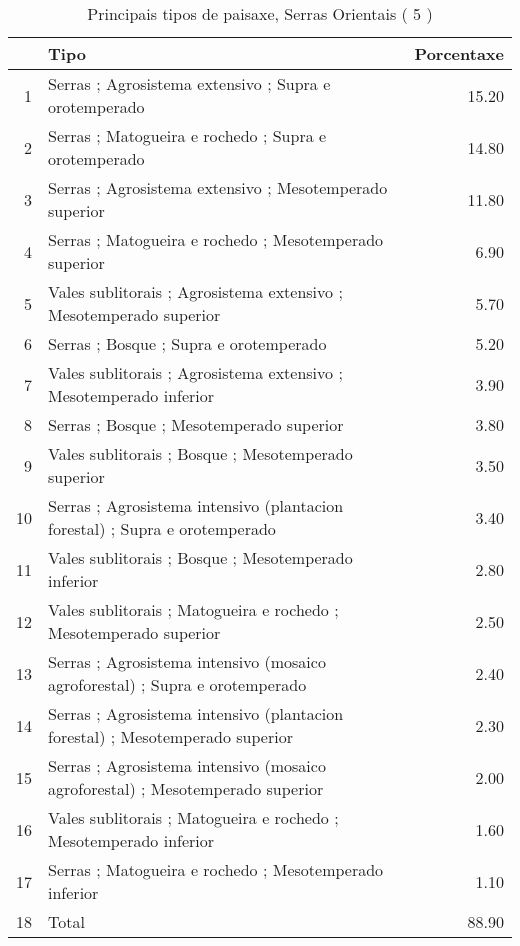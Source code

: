 \begin{table}[p]
\centering
\caption{Principais tipos de paisaxe,  Serras Orientais ( 5 )} 
\label{Tipos 5}
\begin{tabular}{rlr}
  \hline
 & Tipo & Porcentaxe \\ 
  \hline
1 & Serras ; Agrosistema extensivo ; Supra e orotemperado & 15.20 \\ 
  2 & Serras ; Matogueira e rochedo ; Supra e orotemperado & 14.80 \\ 
  3 & Serras ; Agrosistema extensivo ; Mesotemperado superior & 11.80 \\ 
  4 & Serras ; Matogueira e rochedo ; Mesotemperado superior & 6.90 \\ 
  5 & Vales sublitorais ; Agrosistema extensivo ; Mesotemperado superior & 5.70 \\ 
  6 & Serras ; Bosque ; Supra e orotemperado & 5.20 \\ 
  7 & Vales sublitorais ; Agrosistema extensivo ; Mesotemperado inferior & 3.90 \\ 
  8 & Serras ; Bosque ; Mesotemperado superior & 3.80 \\ 
  9 & Vales sublitorais ; Bosque ; Mesotemperado superior & 3.50 \\ 
  10 & Serras ; Agrosistema intensivo (plantacion forestal) ; Supra e orotemperado & 3.40 \\ 
  11 & Vales sublitorais ; Bosque ; Mesotemperado inferior & 2.80 \\ 
  12 & Vales sublitorais ; Matogueira e rochedo ; Mesotemperado superior & 2.50 \\ 
  13 & Serras ; Agrosistema intensivo (mosaico agroforestal) ; Supra e orotemperado & 2.40 \\ 
  14 & Serras ; Agrosistema intensivo (plantacion forestal) ; Mesotemperado superior & 2.30 \\ 
  15 & Serras ; Agrosistema intensivo (mosaico agroforestal) ; Mesotemperado superior & 2.00 \\ 
  16 & Vales sublitorais ; Matogueira e rochedo ; Mesotemperado inferior & 1.60 \\ 
  17 & Serras ; Matogueira e rochedo ; Mesotemperado inferior & 1.10 \\ 
  18 & Total & 88.90 \\ 
   \hline
\end{tabular}
\end{table}
